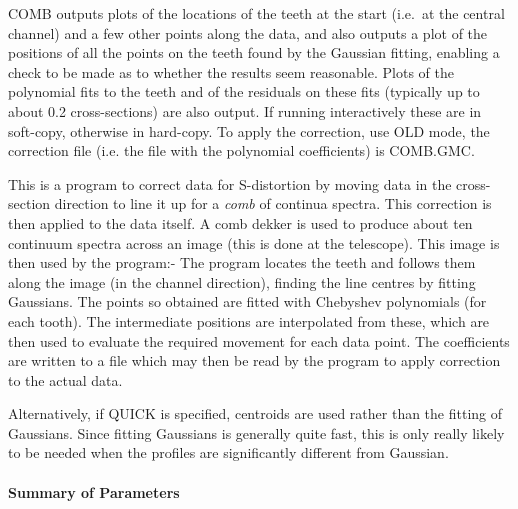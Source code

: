 \documentclass[11pt,twoside]{article}
\begin{document}
COMB outputs plots of the locations of the teeth at the start (i.e.\ at
the central channel) and a few other points along the data, and also
outputs a plot of the positions of all the points on the teeth found by
the Gaussian fitting, enabling a check to be made as to whether the
results seem reasonable.
Plots of the polynomial fits to the teeth and of the residuals on these
fits (typically up to about 0.2 cross-sections) are also output. If
running interactively these are in soft-copy, otherwise in hard-copy.
To apply the correction, use OLD mode, the correction file (i.e. the
file with the polynomial coefficients) is COMB.GMC.

This is a program to correct data for S-distortion by moving data in
the cross-section direction to line it up for a {\em comb} of continua
spectra. This correction is then applied to the data itself. A comb
dekker is used to produce about ten continuum spectra across an image
(this is done at the telescope). This image is then used by the
program:- The program locates the teeth and follows them along the
image (in the channel direction), finding the line centres by fitting
Gaussians. The points so obtained are fitted with Chebyshev polynomials
(for each tooth). The intermediate positions are interpolated from
these, which are then used to evaluate the required movement for each
data point. The coefficients are written to a file which may then be
read by the program to apply correction to the actual data.

Alternatively, if QUICK is specified, centroids are used rather than
the fitting of Gaussians.
Since fitting Gaussians is generally quite fast, this is only really
likely to be needed when the profiles are significantly different from
Gaussian.

\paragraph{Summary of Parameters}
\end{document}
